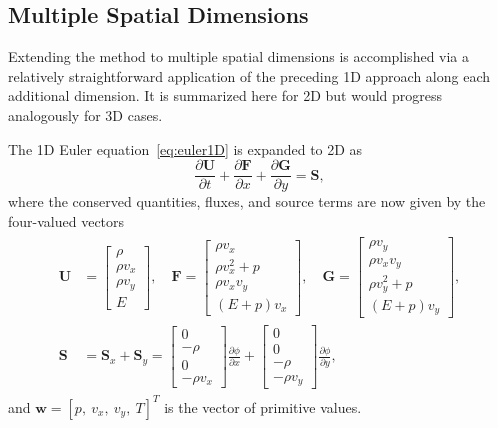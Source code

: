 \subsection{Multiple Spatial Dimensions}
\label{subsec:multiDim}

Extending the method to multiple spatial dimensions is accomplished via a relatively straightforward application of the preceding 1D approach along each additional dimension. It is summarized here for 2D but would progress analogously for 3D cases.

The 1D Euler equation~\eqref{eq:euler1D} is expanded to 2D as
\begin{equation} \label{eq:euler2D}
\frac{\partial \mathbf{U}}{\partial t}+\frac{\partial \mathbf{F}}{\partial x}+\frac{\partial \mathbf{G}}{\partial y}=\mathbf{S},
\end{equation}
where the conserved quantities, fluxes, and source terms are now given by the four-valued vectors
\begin{align}
\begin{split}
\mathbf{U}&=
\begin{bmatrix}
\rho \\ \rho v_x \\ \rho v_y \\ E
\end{bmatrix}
,\quad \mathbf{F}=
\begin{bmatrix}
\rho v_x \\ \rho v_x^2+p \\ \rho v_x v_y \\ (E+p)v_x
\end{bmatrix}
,\quad \mathbf{G}=
\begin{bmatrix}
\rho v_y \\ \rho v_x v_y \\ \rho v_y^2+p \\ (E+p)v_y
\end{bmatrix}, \\
\mathbf{S}&=\mathbf{S}_x+\mathbf{S}_y=
\begin{bmatrix}
0 \\ -\rho \\ 0 \\ -\rho v_x
\end{bmatrix} \frac{\partial \phi}{\partial x} +
\begin{bmatrix}
0 \\ 0 \\ -\rho \\ -\rho v_y
\end{bmatrix} \frac{\partial \phi}{\partial y},
\end{split}
\end{align}
and $\mathbf{w}=[p,\ v_x,\ v_y,\ T]^T$ is the vector of primitive values.

